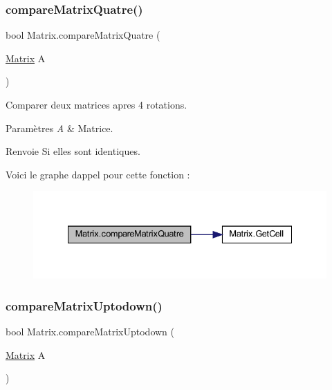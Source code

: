 \subsubsection{\texorpdfstring{compare\+Matrix\+Quatre()}{compareMatrixQuatre()}}
{\footnotesize\ttfamily bool Matrix.\+compare\+Matrix\+Quatre (\begin{DoxyParamCaption}\item[{\mbox{\hyperlink{class_matrix}{Matrix}}}]{A }\end{DoxyParamCaption})\hspace{0.3cm}{\ttfamily [inline]}}



Comparer deux matrices apres 4 rotations. 


\begin{DoxyParams}{Paramètres}
{\em A} & Matrice.\\
\hline
\end{DoxyParams}
\begin{DoxyReturn}{Renvoie}
Si elles sont identiques.
\end{DoxyReturn}
Voici le graphe d\textquotesingle{}appel pour cette fonction \+:\nopagebreak
\begin{figure}[H]
\begin{center}
\leavevmode
\includegraphics[width=335pt]{class_matrix_adfbbe521a0688e507a05f5590daf9ea4_cgraph}
\end{center}
\end{figure}
\mbox{\label{class_matrix_af7b27f62f9cc10b69fd583dea958573f}} 
\subsubsection{\texorpdfstring{compare\+Matrix\+Uptodown()}{compareMatrixUptodown()}}
{\footnotesize\ttfamily bool Matrix.\+compare\+Matrix\+Uptodown (\begin{DoxyParamCaption}\item[{\mbox{\hyperlink{class_matrix}{Matrix}}}]{A }\end{DoxyParamCaption})\hspace{0.3cm}{\ttfamily [inline]}}



